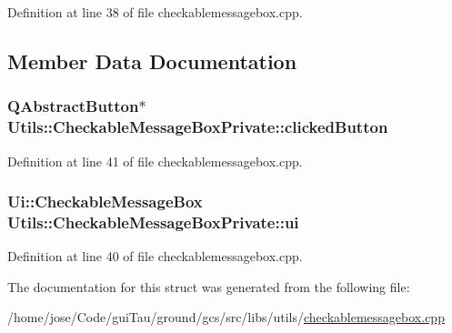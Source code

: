 Definition at line 38 of file checkablemessagebox.\-cpp.



\subsection{Member Data Documentation}
\hypertarget{struct_utils_1_1_checkable_message_box_private_aceb1fbc032f66e65b09251d13e2bb874}{
\subsubsection[{clicked\-Button}]{\setlength{\rightskip}{0pt plus 5cm}Q\-Abstract\-Button$\ast$ Utils\-::\-Checkable\-Message\-Box\-Private\-::clicked\-Button}}\label{struct_utils_1_1_checkable_message_box_private_aceb1fbc032f66e65b09251d13e2bb874}


Definition at line 41 of file checkablemessagebox.\-cpp.

\hypertarget{struct_utils_1_1_checkable_message_box_private_a7775c12cc49befaa49faec030c670e1b}{
\subsubsection[{ui}]{\setlength{\rightskip}{0pt plus 5cm}Ui\-::\-Checkable\-Message\-Box Utils\-::\-Checkable\-Message\-Box\-Private\-::ui}}\label{struct_utils_1_1_checkable_message_box_private_a7775c12cc49befaa49faec030c670e1b}


Definition at line 40 of file checkablemessagebox.\-cpp.



The documentation for this struct was generated from the following file\-:\begin{DoxyCompactItemize}
\item 
/home/jose/\-Code/gui\-Tau/ground/gcs/src/libs/utils/\hyperlink{checkablemessagebox_8cpp}{checkablemessagebox.\-cpp}\end{DoxyCompactItemize}
